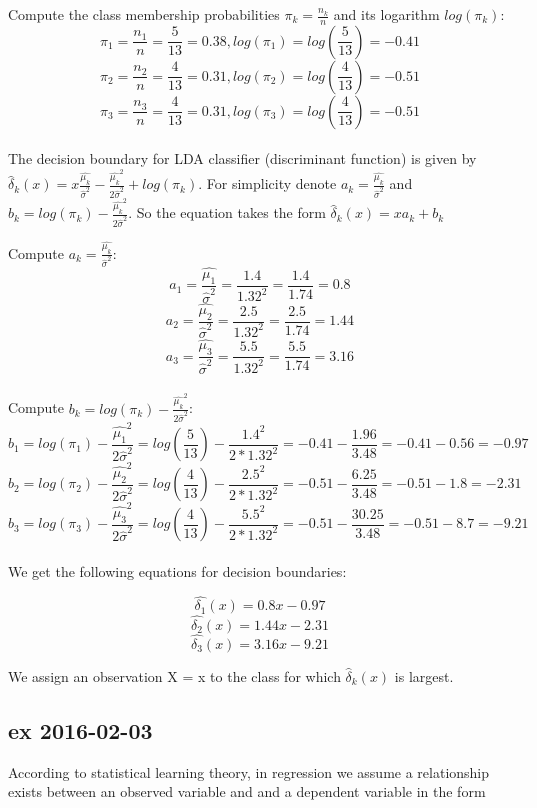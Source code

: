 \documentclass[a4paper,12pt,titlepage]{article} %
\begin{document}
Compute the class membership probabilities $ \pi_{k} = \frac{n_{k} }{n}$ and its logarithm $ log(\pi_{k})$:
$$ \pi_{1} = \frac{n_{1} }{n} = \frac{5}{13} = 0.38, log(\pi_{1}) = log(\frac{5}{13}) = -0.41 $$
$$ \pi_{2} = \frac{n_{2} }{n} = \frac{4}{13} = 0.31, log(\pi_{2}) = log(\frac{4}{13}) = -0.51 $$
$$ \pi_{3} = \frac{n_{3} }{n} = \frac{4}{13} = 0.31, log(\pi_{3}) = log(\frac{4}{13}) = -0.51 $$\\

The decision boundary for LDA classifier (discriminant function) is given by $ \hat{\delta}_{k}(x) = x \frac{\hat{\mu_{k}} }{\hat{\sigma}^{2}} - \frac{\hat{\mu_{k}}^{2} }{2\hat{\sigma}^{2} } + log(\pi_{k})$. 
For simplicity denote $ a_{k} = \frac{\hat{\mu_{k}} }{\hat{\sigma}^{2}} $ and $ b_{k} = log(\pi_{k}) - \frac{\hat{\mu_{k}}^{2} }{2\hat{\sigma}^{2} }$. 
So the equation takes the form $ \hat{\delta}_{k}(x) = x a_{k} + b_{k}$

Compute $ a_{k} = \frac{\hat{\mu_{k}} }{\hat{\sigma}^{2}} $:
$$ a_{1} = \frac{\hat{\mu_{1}} }{\hat{\sigma}^{2}} = \frac{1.4}{1.32^{2}} = \frac{1.4}{1.74} = 0.8 $$
$$ a_{2} = \frac{\hat{\mu_{2}} }{\hat{\sigma}^{2}} = \frac{2.5}{1.32^{2}} = \frac{2.5}{1.74} = 1.44 $$
$$ a_{3} = \frac{\hat{\mu_{3}} }{\hat{\sigma}^{2}} = \frac{5.5}{1.32^{2}} = \frac{5.5}{1.74} = 3.16 $$\\

Compute $ b_{k} = log(\pi_{k}) - \frac{\hat{\mu_{k}}^{2} }{2\hat{\sigma}^{2} }$:
$$ b_{1} = log(\pi_{1}) - \frac{\hat{\mu_{1}}^{2} }{2\hat{\sigma}^{2} } = log(\frac{5}{13}) - \frac{1.4^{2}}{2*1.32^{2}} = -0.41 - \frac{1.96}{3.48} = -0.41 - 0.56 = -0.97 $$
$$ b_{2} = log(\pi_{2}) - \frac{\hat{\mu_{2}}^{2} }{2\hat{\sigma}^{2} } = log(\frac{4}{13}) - \frac{2.5^{2}}{2*1.32^{2}} = -0.51 - \frac{6.25}{3.48} = -0.51 - 1.8 = -2.31 $$
$$ b_{3} = log(\pi_{3}) - \frac{\hat{\mu_{3}}^{2} }{2\hat{\sigma}^{2} } = log(\frac{4}{13}) - \frac{5.5^{2}}{2*1.32^{2}} = -0.51 - \frac{30.25}{3.48} = -0.51 - 8.7 = -9.21 $$\\

We get the following equations for decision boundaries:

$$ \hat{\delta_{1}}(x) = 0.8 x - 0.97 $$
$$ \hat{\delta_{2}}(x) = 1.44 x - 2.31 $$
$$ \hat{\delta_{3}}(x) = 3.16 x - 9.21 $$

We assign an observation X = x to the class for which $ \hat{\delta}_{k}(x) $ is largest.



\newpage

\subsection{ex 2016-02-03}
According to statistical learning theory, in regression we assume a relationship exists between an observed variable and and a dependent variable in the form 
\end{document}
